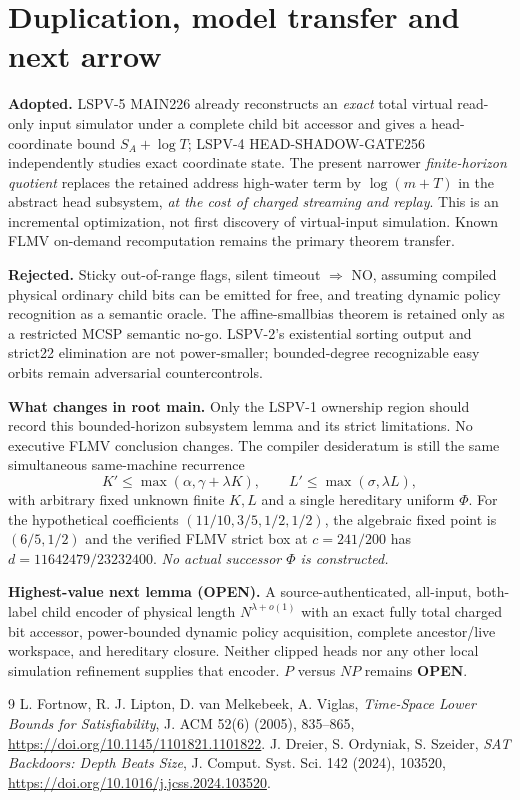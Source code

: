 \documentclass[11pt]{article}
\begin{document}
\section{Duplication, model transfer and next arrow}
\textbf{Adopted.} LSPV-5 MAIN226 already reconstructs an \emph{exact} total virtual read-only input simulator under a complete child bit accessor and gives a head-coordinate bound $S_A+\log T$; LSPV-4 HEAD-SHADOW-GATE256 independently studies exact coordinate state. The present narrower \emph{finite-horizon quotient} replaces the retained address high-water term by $\log(m+T)$ in the abstract head subsystem, \emph{at the cost of charged streaming and replay}. This is an incremental optimization, not first discovery of virtual-input simulation. Known FLMV on-demand recomputation remains the primary theorem transfer.

\textbf{Rejected.} Sticky out-of-range flags, silent timeout $\Rightarrow$ NO, assuming compiled physical ordinary child bits can be emitted for free, and treating dynamic policy recognition as a semantic oracle. The affine-smallbias theorem is retained only as a restricted MCSP semantic no-go. LSPV-2's existential sorting output and strict22 elimination are not power-smaller; bounded-degree recognizable easy orbits remain adversarial countercontrols.

\textbf{What changes in root main.} Only the LSPV-1 ownership region should record this bounded-horizon subsystem lemma and its strict limitations. No executive FLMV conclusion changes. The compiler desideratum is still the same simultaneous same-machine recurrence
\[
K'\le\max(\alpha,\gamma+\lambda K),\qquad
L'\le\max(\sigma,\lambda L),
\]
with arbitrary fixed unknown finite $K,L$ and a single hereditary uniform $\Phi$. For the hypothetical coefficients $(11/10,3/5,1/2,1/2)$, the algebraic fixed point is $(6/5,1/2)$ and the verified FLMV strict box at $c=241/200$ has $d=11642479/23232400$. \emph{No actual successor $\Phi$ is constructed.}

\textbf{Highest-value next lemma (OPEN).} A source-authenticated, all-input, both-label child encoder of physical length $N^{\lambda+o(1)}$ with an exact fully total charged bit accessor, power-bounded dynamic policy acquisition, complete ancestor/live workspace, and hereditary closure. Neither clipped heads nor any other local simulation refinement supplies that encoder. $P$ versus $NP$ remains \textbf{OPEN}.

\begin{thebibliography}{9}
 L. Fortnow, R. J. Lipton, D. van Melkebeek, A. Viglas, \emph{Time-Space Lower Bounds for Satisfiability}, J. ACM 52(6) (2005), 835--865, \url{https://doi.org/10.1145/1101821.1101822}.
 J. Dreier, S. Ordyniak, S. Szeider, \emph{SAT Backdoors: Depth Beats Size}, J. Comput. Syst. Sci. 142 (2024), 103520, \url{https://doi.org/10.1016/j.jcss.2024.103520}.
\end{thebibliography}
\end{document}
